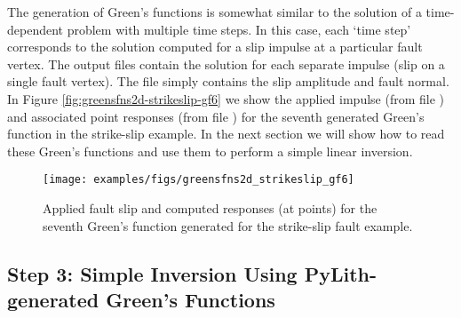 The generation of Green's functions is somewhat similar to the
solution of a time-dependent problem with multiple time steps. In this
case, each `time step' corresponds to the solution computed for a slip
impulse at a particular fault vertex. The output files contain the
solution for each separate impulse (slip on a single fault
vertex). The  file simply contains
the slip amplitude and fault normal. In Figure
\vref{fig:greensfns2d-strikeslip-gf6} we show the applied impulse
(from file ) and associated point
responses (from file ) for the seventh
generated Green's function in the strike-slip example. In the next
section we will show how to read these Green's functions and use them
to perform a simple linear inversion.

\begin{figure}
  \texttt{[image: examples/figs/greensfns2d\_strikeslip\_gf6]}
  \caption{Applied fault slip and computed responses (at points) for the seventh
    Green's function generated for the strike-slip fault example.}
  \label{fig:greensfns2d-strikeslip-gf6}
\end{figure}


\subsection{Step 3: Simple Inversion Using PyLith-generated Green's Functions}
\label{sec:example:greensfns2d:inversion}

